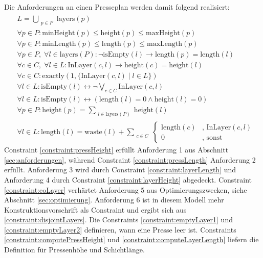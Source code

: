 Die Anforderungen an einen Presseplan werden damit folgend realisiert:
\begin{align}
    & L = \dot{\bigcup_{\substack{p \in P}}} \text{layers}(p) \label{constraint:disjointLayers} \\[10pt]
    & \forall p \in P: \text{minHeight}(p) \leq \text{height}(p) \leq \text{maxHeight}(p) \label{constraint:pressHeight} \\[10pt]
    & \forall p \in P: \text{minLength}(p) \leq \text{length}(p) \leq \text{maxLength}(p) \label{constraint:pressLength} \\[10pt]
    & \forall p \in P,\; \forall l \in \text{layers}(P): \neg \text{isEmpty}(l) \rightarrow \text{length}(p) = \text{length}(l) \label{constraint:layerLength} \\[10pt]
    & \forall c \in C,\; \forall l \in L: \text{InLayer}(c,l) \rightarrow \text{height}(c) = \text{height}(l) \label{constraint:layerHeight} \\[10pt]
    & \forall c \in C: \text{exactly}(1,\{ \text{InLayer}(c,l) \mid l \in L \}) \label{constraint:eoLayer} \\[10pt]
    & \forall l \in L: \text{isEmpty}(l) \leftrightarrow \neg\bigvee_{c \in C} \text{InLayer}(c,l) \label{constraint:emptyLayer1} \\[10pt]
    & \forall l \in L: \text{isEmpty}(l) \leftrightarrow (\text{length}(l) = 0 \land \text{height}(l) = 0) \label{constraint:emptyLayer2} \\[10pt]
    & \forall p \in P: \text{height}(p) = \sum_{\substack{l \in \text{layers}(P)}} \text{height}(l) \label{constraint:computePressHeight} \\[10pt]
    & \forall l \in L: \text{length}(l) = \text{waste}(l) + \sum_{\substack{c \in C}}
    \begin{cases}
        \text{length}(c) & \text{, } \text{InLayer}(c,l) \\
        0 & \text{, sonst}
    \end{cases} \label{constraint:computeLayerLength}
\end{align}
Constraint \ref{constraint:pressHeight} erfüllt Anforderung 1 aus Abschnitt \ref{sec:anforderungen}, während Constraint \ref{constraint:pressLength} Anforderung 2 erfüllt.
Anforderung 3 wird durch Constraint \ref{constraint:layerLength} und Anforderung 4 durch Constraint \ref{constraint:layerHeight} abgedeckt.
Constraint \ref{constraint:eoLayer} verhärtet Anforderung 5 aus Optimierungszwecken, siehe Abschnitt \ref{sec:optimierung}.
Anforderung 6 ist in diesem Modell mehr Konstruktionsvorschrift als Constraint und ergibt sich aus \ref{constraint:disjointLayers}.
Die Constraints \ref{constraint:emptyLayer1} und \ref{constraint:emptyLayer2} definieren, wann eine Presse leer ist.
Constraints \ref{constraint:computePressHeight} und \ref{constraint:computeLayerLength} liefern die Definition für Pressenhöhe und Schichtlänge.

